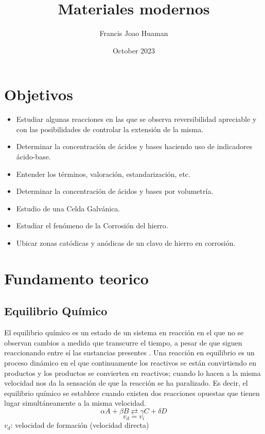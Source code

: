\documentclass[11pt]{article}
\title{Materiales modernos}
\author{Francis Joao Huaman}
\date{October 2023}
\begin{document}
    
    \doublespacing
    \tableofcontents
    \pagebreak
    \section{Objetivos}
    \begin{itemize}
        \item Estudiar algunas reacciones en las que se observa reversibilidad apreciable y con las posibilidades de controlar la extensión de la misma.
        \item Determinar la concentración de ácidos y bases haciendo uso de indicadores ácido-base.
        \item Entender los términos, valoración, estandarización, etc.
        \item Determinar la concentración de ácidos y bases por volumetría.
        \item Estudio de una Celda Galvánica.
        \item Estudiar el fenómeno de la Corrosión del hierro.
        \item Ubicar zonas catódicas y anódicas de un clavo de hierro en corrosión.
    \end{itemize}
    \section{Fundamento teorico}
    \subsection{Equilibrio Qu\'imico}
    El equilibrio químico es un estado de un sistema en reacción en el que no se observan cambios a medida que transcurre el tiempo, a pesar de que siguen reaccionando entre sí las sustancias presentes \cite{bard}. Una reacción en equilibrio es un proceso dinámico en el que continuamente los reactivos se están convirtiendo en productos y los productos se convierten en reactivos; cuando lo hacen a la misma velocidad nos da la sensación de que la reacción se ha paralizado. Es decir, el equilibrio químico se establece cuando existen dos reacciones 
    opuestas que tienen lugar simultáneamente a la misma velocidad.
    \begin{equation*}
        \alpha A + \beta B \rightleftarrows  \gamma C + \delta D
    \end{equation*}
    \begin{equation*}
        v_d = v_i
    \end{equation*}
    $v_d$: velocidad de formación (velocidad directa)
    
\end{document}
